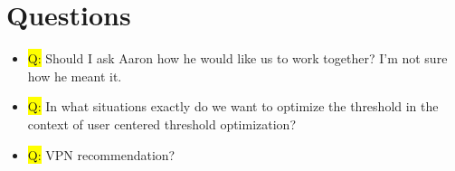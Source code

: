 \documentclass[12pt,a4paper]{article}
\begin{document}
\section*{Questions}
\begin{itemize}
%
\item \colorbox{yellow}{Q:} Should I ask Aaron how he would like us to work together? I'm not sure how he meant it.
%
\item \colorbox{yellow}{Q:} In what situations exactly do we want to optimize the threshold in the context of user centered threshold optimization?
%
\item \colorbox{yellow}{Q:} VPN recommendation?
%
\end{itemize}
\end{document}
